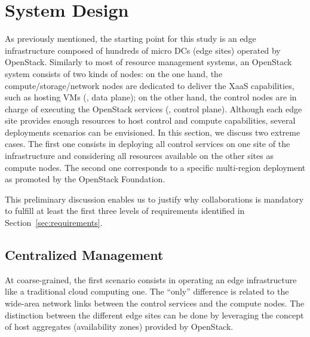 

\section{System Design}
\label{sec:system_design_considerations}
As previously mentioned, the starting point for this study is an edge
infrastructure composed of hundreds of micro DCs (\aka edge sites) operated by OpenStack.
%
Similarly to most of resource management systems, an OpenStack system consists of two kinds
of nodes: on the one hand, the compute/storage/network nodes are
dedicated to deliver the XaaS capabilities, such as hosting VMs (\ie,
data plane); on the other hand, the control nodes are in charge of
executing the OpenStack services (\ie, control plane).
%
Although each edge site provides enough resources to host control and
compute capabilities, several deployments scenarios can be
envisioned.
%
In this section, we discuss two extreme cases. The first one
consists in deploying all control services on one site of the
infrastructure and considering all resources available on the other sites as compute
nodes.  The second one corresponds to a specific multi-region deployment as promoted by the OpenStack Foundation.
%

This preliminary discussion enables us to justify why collaborations is mandatory to
fulfill at least the first three levels of requirements identified in Section~\ref{sec:requirements}.
%

\subsection{Centralized Management}
\label{subsec:centralized_os}
At coarse-grained, the first scenario consists in operating an edge
infrastructure like a traditional cloud computing one.  The ``only''
difference is related to the wide-area network links between the
control services and the compute nodes.  The distinction between the
different edge sites can be done by leveraging the concept of host
aggregates (\aka availability zones) provided by OpenStack.

